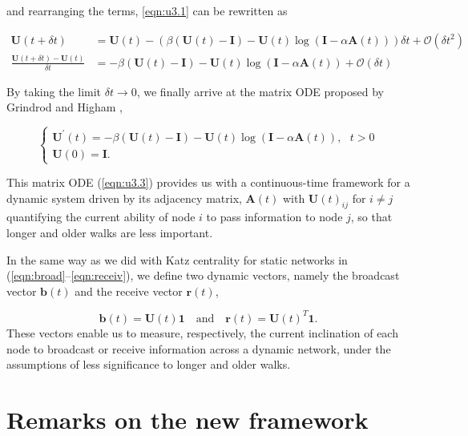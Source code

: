 and rearranging the terms, \eqref{eqn:u3.1} can be rewritten as

\begin{align*}
\mathbf{U}(t + \delta t) &= \mathbf{U}(t) - \left(\beta (\mathbf{U}(t) - \mathbf{I}) - \mathbf{U}(t)\log(\mathbf{I}-\alpha\mathbf{A}(t))\right) \delta t + \mathcal{O}(\delta t^2) \\
\frac{\mathbf{U}(t + \delta t) - \mathbf{U}(t)}{\delta t} &= -\beta (\mathbf{U}(t) - \mathbf{I}) - \mathbf{U}(t)\log (\mathbf{I} - \alpha \mathbf{A}(t)) + \mathcal{O}(\delta t)
\end{align*}

By taking the limit $\delta t \to 0$, we finally arrive at the matrix ODE proposed by Grindrod and Higham \cite{grindrod2014dynamical}, 

\begin{equation}
\label{eqn:u3.3}
    \begin{cases}
      \mathbf{U^{\prime}}(t) = -\beta (\mathbf{U}(t) - \mathbf{I}) - \mathbf{U}(t)\log (\mathbf{I} - \alpha \mathbf{A}(t)), ~~~t>0\\
      \mathbf{U}(0)=\mathbf{I}.
    \end{cases}
\end{equation}

This matrix ODE (\ref{eqn:u3.3}) provides us with a continuous-time framework for a dynamic system driven by its adjacency matrix, $\mathbf{A}(t)$ with $\mathbf{U}(t)_{ij}$ for $i\ne j$ quantifying the current ability of node $i$ to pass information to node $j$, so that longer and older walks are less important.

In the same way as we did with Katz centrality for static networks in (\ref{eqn:broad}--\ref{eqn:receiv}), we define two dynamic vectors, namely the broadcast vector $\mathbf{b}(t)$ and the receive vector $\mathbf{r}(t)$,

\begin{equation}
\label{eqn:u3.4}
    \mathbf{b}(t) = \mathbf{U}(t)\mathbf{1} \text{~~~and~~~} \mathbf{r}(t) = \mathbf{U}(t)^T\mathbf{1}.
\end{equation}
These vectors enable us to measure, respectively, the current inclination of each node to broadcast or receive information across a dynamic network, under the assumptions of less significance to longer and older walks.


\section{Remarks on the new framework}
\label{sec:remarks}

